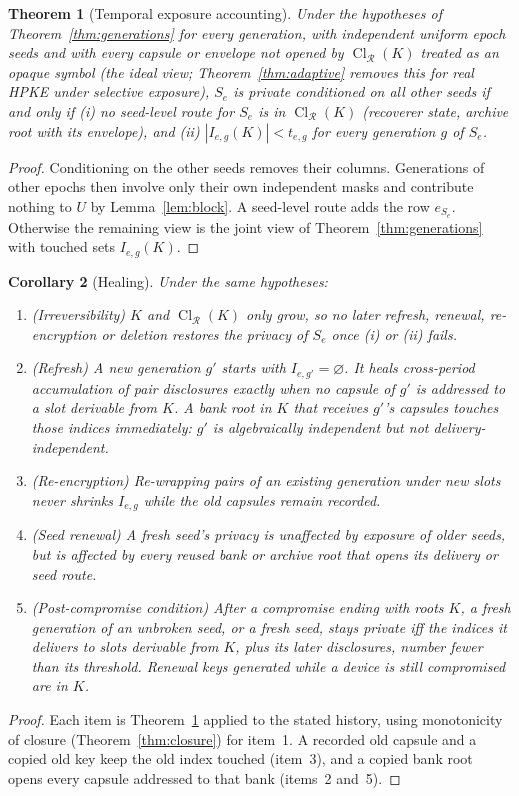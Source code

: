 \documentclass[pdflatex,sn-mathphys-num]{sn-jnl}
\theoremstyle{plain}
\newtheorem{theorem}{Theorem}
\newtheorem{corollary}[theorem]{Corollary}
\theoremstyle{definition}
\newcommand{\Cl}{\operatorname{Cl}}
\begin{document}
\begin{theorem}[Temporal exposure accounting]\label{thm:temporal}
Under the hypotheses of Theorem~\ref{thm:generations} for every generation, with independent uniform epoch seeds and with every capsule or envelope not opened by $\Cl_{\mathcal R}(K)$ treated as an opaque symbol (the ideal view; Theorem~\ref{thm:adaptive} removes this for real HPKE under selective exposure), $S_e$ is private conditioned on all other seeds if and only if (i) no seed-level route for $S_e$ is in $\Cl_{\mathcal R}(K)$ (recoverer state, archive root with its envelope), and (ii) $|I_{e,g}(K)|<t_{e,g}$ for every generation $g$ of $S_e$.
\end{theorem}
\begin{proof}
Conditioning on the other seeds removes their columns. Generations of other epochs then involve only their own independent masks and contribute nothing to $U$ by Lemma~\ref{lem:block}. A seed-level route adds the row $e_{S_e}$. Otherwise the remaining view is the joint view of Theorem~\ref{thm:generations} with touched sets $I_{e,g}(K)$.
\end{proof}

\begin{corollary}[Healing]\label{cor:healing}
Under the same hypotheses:
\begin{enumerate}
\item (Irreversibility) $K$ and $\Cl_{\mathcal R}(K)$ only grow, so no later refresh, renewal, re-encryption or deletion restores the privacy of $S_e$ once (i) or (ii) fails.
\item (Refresh) A new generation $g'$ starts with $I_{e,g'}=\varnothing$. It heals cross-period accumulation of pair disclosures exactly when no capsule of $g'$ is addressed to a slot derivable from $K$. A bank root in $K$ that receives $g'$'s capsules touches those indices immediately: $g'$ is algebraically independent but not delivery-independent.
\item (Re-encryption) Re-wrapping pairs of an existing generation under new slots never shrinks $I_{e,g}$ while the old capsules remain recorded.
\item (Seed renewal) A fresh seed's privacy is unaffected by exposure of older seeds, but is affected by every reused bank or archive root that opens its delivery or seed route.
\item (Post-compromise condition) After a compromise ending with roots $K$, a fresh generation of an unbroken seed, or a fresh seed, stays private iff the indices it delivers to slots derivable from $K$, plus its later disclosures, number fewer than its threshold. Renewal keys generated while a device is still compromised are in $K$.
\end{enumerate}
\end{corollary}
\begin{proof}
Each item is Theorem~\ref{thm:temporal} applied to the stated history, using monotonicity of closure (Theorem~\ref{thm:closure}) for item~1. A recorded old capsule and a copied old key keep the old index touched (item~3), and a copied bank root opens every capsule addressed to that bank (items~2 and~5).
\end{proof}
\end{document}
